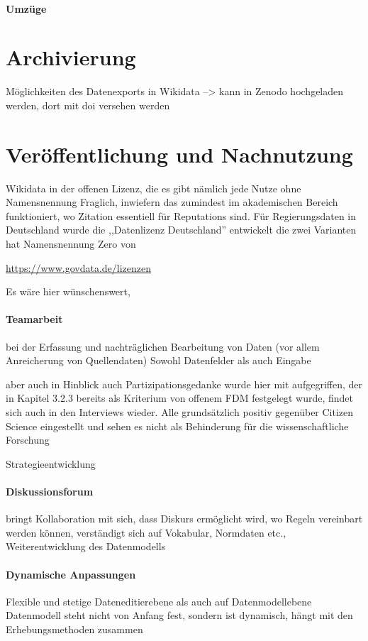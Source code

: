 \paragraph{Umzüge}
\section{Archivierung}
Möglichkeiten des Datenexports in Wikidata --> kann in Zenodo hochgeladen werden, dort mit doi versehen werden




  
\section{Veröffentlichung und Nachnutzung}

Wikidata in der offenen Lizenz, die es gibt nämlich jede Nutze ohne Namensnennung
Fraglich, inwiefern das zumindest im akademischen Bereich funktioniert, wo Zitation essentiell für Reputations sind.
Für Regierungsdaten in Deutschland wurde die ,,Datenlizenz Deutschland'' entwickelt die zwei Varianten hat
Namensnennung
Zero 
von  

\url{https://www.govdata.de/lizenzen}

Es wäre hier wünschenswert, 

\paragraph{Teamarbeit}
bei der Erfassung und nachträglichen Bearbeitung von Daten (vor allem Anreicherung von Quellendaten)
Sowohl Datenfelder als auch Eingabe

aber auch in Hinblick auch Partizipationsgedanke wurde hier mit aufgegriffen, der in Kapitel 3.2.3 bereits als Kriterium von offenem FDM festgelegt wurde, findet sich auch in den Interviews wieder. Alle grundsätzlich positiv gegenüber Citizen Science eingestellt und sehen es nicht als Behinderung für die wissenschaftliche Forschung 

Strategieentwicklung

\paragraph{Diskussionsforum}
bringt Kollaboration mit sich, dass Diskurs ermöglicht wird, wo Regeln vereinbart werden können, verständigt sich auf Vokabular, Normdaten etc., Weiterentwicklung des Datenmodells
\paragraph{Dynamische Anpassungen}
Flexible und stetige 
Dateneditierebene als auch auf Datenmodellebene
Datenmodell steht nicht von Anfang fest, sondern ist dynamisch, hängt mit den Erhebungsmethoden zusammen
